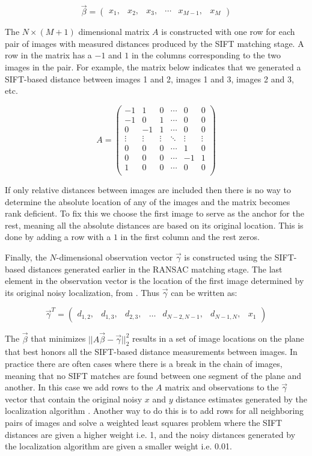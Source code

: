 \documentclass[10pt,twocolumn,letterpaper]{article}
\begin{document}
\[\vec{\beta} =
\begin{pmatrix}
  x_1, & x_2, & x_3, & \cdots & x_{M-1}, & x_M
\end{pmatrix}
\]

The $N \times (M+1)$ dimensional matrix $A$ is constructed with one
row for each pair of images with measured distances produced by the
SIFT matching stage. A row in the matrix has a $-1$ and $1$ in the
columns corresponding to the two images in the pair. For example, the
matrix below indicates that we generated a SIFT-based distance between
images 1 and 2, images 1 and 3, images 2 and 3, etc.

\[
A =
\begin{pmatrix}
  -1 & 1 & 0 & \cdots & 0 & 0\\
  -1 & 0 & 1 & \cdots & 0 & 0\\
  0 & -1 & 1 & \cdots & 0 & 0\\
  \vdots  & \vdots & \vdots & \ddots & \vdots  & \vdots\\
  0 & 0 & 0 & \cdots & 1 & 0 \\
  0 & 0 & 0 & \cdots & -1 & 1 \\
  1 & 0 & 0 & \cdots & 0 & 0 \\
\end{pmatrix}
\]

If only relative distances between images are included then there is
no way to determine the absolute location of any of the images and the
matrix becomes rank deficient. To fix this we choose the first image
to serve as the anchor for the rest, meaning all the absolute
distances are based on its original location. This is done by adding a
row with a $1$ in the first column and the rest zeros.

Finally, the $N$-dimensional observation vector $\vec{\gamma}$ is
constructed using the SIFT-based distances generated earlier in the
RANSAC matching stage. The last element in the observation vector is
the location of the first image determined by its original noisy
localization, from \cite{chen2010indoor, liu2010indoor}. Thus
$\vec{\gamma}$ can be written as:

\[
\vec{\gamma}^T =
\begin{pmatrix}
  d_{1,2}, &d_{1,3}, &d_{2,3}, &\hdots &d_{N-2,N-1}, &d_{N-1,N}, &x_1
\end{pmatrix}
\]

The $\vec{\beta}$ that minimizes $||A \vec{\beta} -
\vec{\gamma}||_2^2$ results in a set of image locations on the plane
that best honors all the SIFT-based distance measurements between
images. In practice there are often cases where there is a break in
the chain of images, meaning that no SIFT matches are found between
one segment of the plane and another. In this case we add rows to the
$A$ matrix and observations to the $\vec{\gamma}$ vector that contain
the original noisy $x$ and $y$ distance estimates generated by the
localization algorithm \cite{chen2010indoor, liu2010indoor}. Another
way to do this is to add rows for all neighboring pairs of images and
solve a weighted least squares problem where the SIFT distances are
given a higher weight i.e. 1, and the noisy distances generated by the
localization algorithm \cite{chen2010indoor, liu2010indoor} are given
a smaller weight i.e. 0.01.
\end{document}
